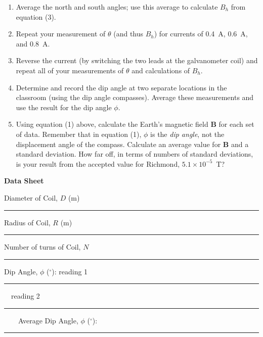 \begin{enumerate}[labparts]
\item Average the north and south angles; use this average to calculate 
$B_h$ from equation (3).

\item Repeat your measurement of $\theta$ (and thus $B_h$) for currents of 0.4~A, 0.6~A, and 0.8~A.

\item Reverse the current (by switching the two leads at the galvanometer coil)
 and repeat all of your measurements of $\theta$ and calculations of $B_h$.
 
\item Determine and record the dip angle at two separate locations in the 
classroom (using the dip angle compasses). Average these measurements and use 
the result for the dip angle $\phi$.

\item Using equation (1) above, calculate the Earth's magnetic field 
\textbf{B} for each set of data. Remember that in equation (1), $\phi$
is the \textit{dip angle}, not the displacement angle of the compass.
Calculate an average value for \textbf{B} and a standard deviation.
How far off, in terms of numbers of standard deviations, is your result
from the accepted value for Richmond, $5.1 \times 10^{-5}$~T?
\end{enumerate}


\newpage

{\centering \textbf{Data Sheet}\par}


Diameter of Coil, $D$ (m)  \rule{2cm}{.1pt}  

Radius of Coil, $R$ (m) \rule{2cm}{.1pt} 

Number of turns of Coil, $N$  \rule{2cm}{.1pt}

Dip Angle, \( \phi  \) (\( ^{\circ } \)): reading 1 \rule{1cm}{.1pt}
~~reading 2 \rule{1cm}{.1pt}
~~~~Average Dip Angle, \( \phi  \) (\( ^{\circ } \)): \rule{2cm}{.1pt}

